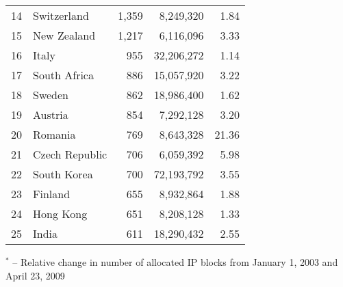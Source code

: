 \begin{table*}[tp]
\begin{minipage}[t]{0.48\textwidth}
\begin{center}
\begin{tabular}{|l||l|r|r|r|}
14      &       Switzerland     &       1,359   &       8,249,320       &         1.84  \tabularnewline
15      &       New Zealand     &       1,217   &       6,116,096       &         3.33  \tabularnewline
16      &       Italy   &       955     &       32,206,272      &         1.14  \tabularnewline
17      &       South Africa    &       886     &       15,057,920      &         3.22  \tabularnewline
18      &       Sweden  &       862     &       18,986,400      &         1.62  \tabularnewline
19      &       Austria &       854     &       7,292,128       &         3.20  \tabularnewline
20      &       Romania &       769     &       8,643,328       &        21.36  \tabularnewline
21      &       Czech Republic  &       706     &       6,059,392       &         5.98  \tabularnewline
22      &       South Korea     &       700     &       72,193,792      &         3.55  \tabularnewline
23      &       Finland &       655     &       8,932,864       &         1.88  \tabularnewline
24      &       Hong Kong       &       651     &       8,208,128       &         1.33  \tabularnewline
25      &       India   &       611     &       18,290,432      &         2.55  \tabularnewline
	\hline
	\end{tabular}
	\end{center}

	\small	$^{*}$ -- Relative change in number of allocated IP blocks from January 1, 2003 and April 23, 2009
\end{minipage}

\vspace{1cm}


\end{table*}
